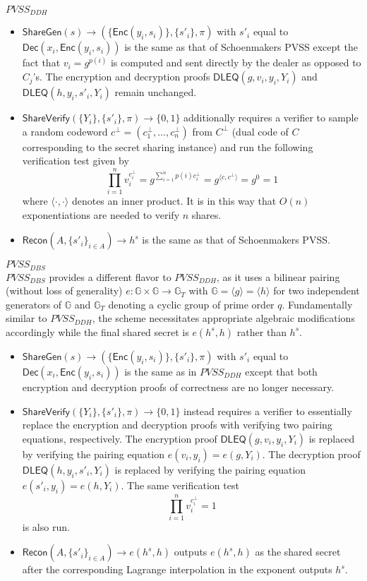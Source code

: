 \documentclass[letterpaper,twocolumn,10pt]{article}
\theoremstyle{definition}
\theoremstyle{remark}
\begin{document}
\noindent\underline{$PVSS_{DDH}$}
\begin{itemize}
\item $\mathsf{ShareGen}(s) \rightarrow (\{\mathsf{Enc}(y_i, s_i)\}, \{s'_i\}, \pi)$ with $s'_i$ equal to $\mathsf{Dec}(x_i, \mathsf{Enc}(y_i, s_i))$ is the same as that of Schoenmakers PVSS except the fact that $v_i = g^{p(i)}$ is computed and sent directly by the dealer as opposed to $C_j$'s. The encryption and decryption proofs $\mathsf{DLEQ}(g, v_i, y_i, Y_i)$ and $\mathsf{DLEQ}(h, y_i, s'_i, Y_i)$ remain unchanged.
\item $\mathsf{ShareVerify}(\{Y_i\}, \{s'_i\}, \pi) \rightarrow \{0, 1\}$ additionally requires a verifier to sample a random codeword $c^\perp = (c_1^\perp, ..., c_n^\perp)$ from $C^\perp$ (dual code of $C$ corresponding to the secret sharing instance) and run the following verification test given by
\[
\prod_{i = 1}^n v_i^{c_i^\perp} = g^{\sum_{i = 1}^n p(i) c_i^\perp} = g^{\langle c, c^\perp \rangle} = g^0 = 1
\]
where $\langle \cdot, \cdot \rangle$ denotes an inner product. It is in this way that $O(n)$ exponentiations are needed to verify $n$ shares.
\item $\mathsf{Recon}(A, \{s'_i\}_{i \in A}) \rightarrow h^s$ is the same as that of Schoenmakers PVSS.
\end{itemize}

\noindent\underline{$PVSS_{DBS}$}\\
$PVSS_{DBS}$ provides a different flavor to $PVSS_{DDH}$, as it uses a bilinear pairing (without loss of generality) $e: \mathbb{G} \times \mathbb{G} \rightarrow \mathbb{G}_T$ with $\mathbb{G} = \langle g \rangle = \langle h \rangle$ for two independent generators of $\mathbb{G}$ and $\mathbb{G}_T$ denoting a cyclic group of prime order $q$. Fundamentally similar to $PVSS_{DDH}$, the scheme necessitates appropriate algebraic modifications accordingly while the final shared secret is $e(h^s, h)$ rather than $h^s$.
\begin{itemize}
\item $\mathsf{ShareGen}(s) \rightarrow (\{\mathsf{Enc}(y_i, s_i)\}, \{s'_i\}, \pi)$ with $s'_i$ equal to $\mathsf{Dec}(x_i, \mathsf{Enc}(y_i, s_i))$ is the same as in $PVSS_{DDH}$ except that both encryption and decryption proofs of correctness are no longer necessary.
\item $\mathsf{ShareVerify}(\{Y_i\}, \{s'_i\}, \pi) \rightarrow \{0, 1\}$ instead requires a verifier to essentially replace the encryption and decryption proofs with verifying two pairing equations, respectively. The encryption proof $\mathsf{DLEQ}(g, v_i, y_i, Y_i)$ is replaced by verifying the pairing equation $e(v_i, y_i) = e(g, Y_i)$. The decryption proof $\mathsf{DLEQ}(h, y_i, s'_i, Y_i)$ is replaced by verifying the pairing equation $e(s'_i, y_i) = e(h, Y_i)$. The same verification test
\[
\prod_{i = 1}^n v_i^{c_i^\perp} = 1
\]
is also run.
\item $\mathsf{Recon}(A, \{s'_i\}_{i \in A}) \rightarrow e(h^s, h)$ outputs $e(h^s, h)$ as the shared secret after the corresponding Lagrange interpolation in the exponent outputs $h^s$.
\end{itemize}
\fi
\end{document}
